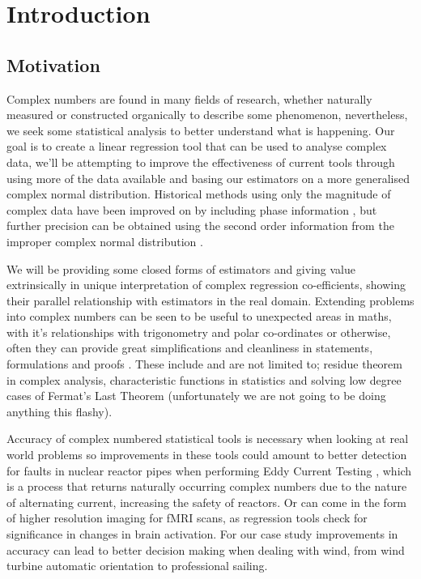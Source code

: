 \documentclass[honours,12pt]{unswthesis}
\newcommand\blankpage{%
    \null
    \thispagestyle{empty}%
    \addtocounter{page}{-1}%
    \newpage}
\numberwithin{equation}{section}
\begin{document}
\afterpage{\blankpage}


\afterpreface

%
%

\afterpage{\blankpage}

\chapter{Introduction}\label{s-intro}

\section{Motivation}

Complex numbers are found in many fields of research, whether naturally measured or constructed organically to describe some phenomenon, nevertheless, we seek some statistical analysis to better understand what is happening. Our goal is to create a linear regression tool that can be used to analyse complex data, we'll be attempting to improve the effectiveness of current tools through using more of the data available and basing our estimators on a more generalised complex normal distribution. Historical methods using only the magnitude of complex data \cite{lai1997} have been improved on by including phase information \cite{rowe2004}, but further precision can be obtained using the second order information from the improper complex normal distribution \cite{picinobo1998}. \par
 We will be providing some closed forms of estimators and giving value extrinsically in unique interpretation of complex regression co-efficients, showing their parallel relationship with estimators in the real domain. Extending problems into complex numbers can be seen to be useful to unexpected areas in maths, with it's relationships with trigonometry and polar co-ordinates or otherwise, often they can provide great simplifications and cleanliness in statements, formulations and proofs \cite{complexstackex}. These include and are not limited to; residue theorem in complex analysis, characteristic functions in statistics and solving low degree cases of Fermat's Last Theorem (unfortunately we are not going to be doing anything this flashy).\par
Accuracy of complex numbered statistical tools is necessary when looking at real world problems so improvements in these tools could amount to better detection for faults in nuclear reactor pipes when performing Eddy Current Testing \cite{garcia2011}, which is a process that returns naturally occurring complex numbers due to the nature of alternating current, increasing the safety of reactors. Or can come in the form of higher resolution imaging for fMRI scans, as regression tools check for significance in changes in brain activation. For our case study improvements in accuracy can lead to better decision making when dealing with wind, from wind turbine automatic orientation to professional sailing.
\end{document}
